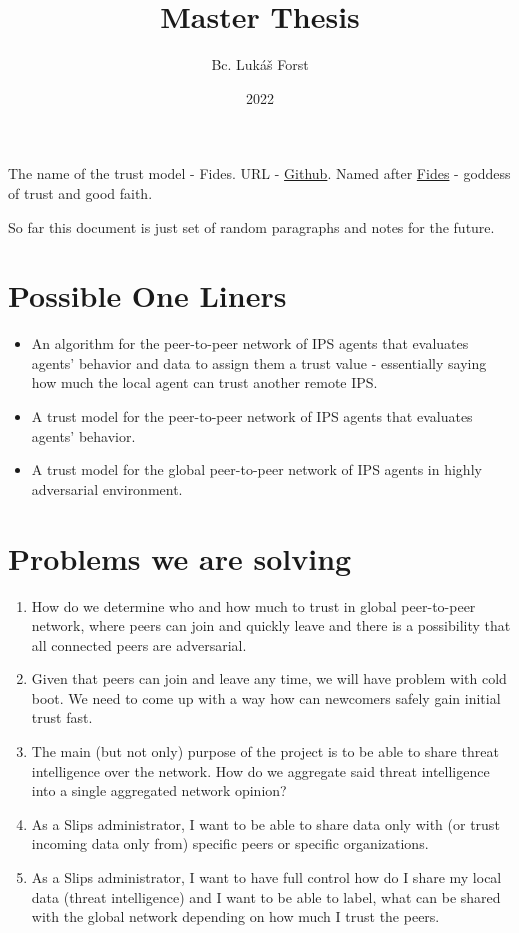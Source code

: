 \documentclass{article}
\title{Master Thesis}
\author{Bc. Lukáš Forst}
\date{2022}
\begin{document}
\maketitle

The name of the trust model - Fides. URL - \href{https://github.com/LukasForst/fides}{Github}.
Named after \href{https://en.wikipedia.org/wiki/Fides_(deity)}{Fides} - goddess of trust and good faith.

So far this document is just set of random paragraphs and notes for the future.

\section{Possible One Liners}
\begin{itemize}
\item An algorithm for the peer-to-peer network of IPS agents that evaluates agents’ behavior and data to assign them a trust value - essentially saying how much the local agent can trust another remote IPS.
\item A trust model for the peer-to-peer network of IPS agents that evaluates agents’ behavior.
\item A trust model for the global peer-to-peer network of IPS agents in highly adversarial environment.
\end{itemize}

\section{Problems we are solving}
\begin{enumerate}
\item How do we determine who and how much to trust in global peer-to-peer network, where peers can join and quickly leave and there is a possibility that all connected peers are adversarial.
\item Given that peers can join and leave any time, we will have problem with cold boot. We need to come up with a way how can newcomers safely gain initial trust fast.
\item The main (but not only) purpose of the project is to be able to share threat intelligence over the network. How do we aggregate said threat intelligence into a single aggregated network opinion?
\item As a Slips administrator, I want to be able to share data only with (or trust incoming data only from) specific peers or specific organizations.
\item As a Slips administrator, I want to have full control how do I share my local data (threat intelligence) and I want to be able to label, what can be shared with the global network depending on how much I trust the peers.
\end{enumerate}










\end{document}
